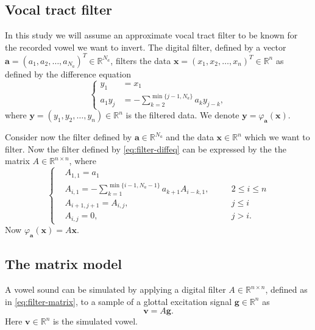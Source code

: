 \documentclass[12pt,a4]{article}
\newcommand{\R}{{\mathbb R}}
\newcommand{\vc}[1]{\ensuremath{\bm{#1}}}
\begin{document}
\subsection{Vocal tract filter}
\label{sec:filter}

In this study we will assume an approximate vocal tract filter to be known for the recorded vowel we want to invert. The digital filter, defined by a vector $\vc{a} = \left( a_1, a_2, \ldots , a_{N_a} \right)^T \in \R^{N_a}$, filters the data $\vc{x} = \left( x_1, x_2, \ldots , x_n \right)^T \in \R^n$ as defined by the difference equation
\begin{equation}
\left\{
\begin{alignedat}{1}
\label{eq:filter-diffeq}
y_1     &= x_1 \\
a_1 y_j &= -\sum_{k=2}^{\min\{j-1, N_a\}} a_{k} y_{j-k} ,
\end{alignedat}
\right.
\end{equation}
where $\vc{y} = \left( y_1, y_2, \ldots , y_n \right) \in \R^n$ is the filtered data. We denote $\vc{y} = \varphi_{\vc{a}} (\vc{x})$.

Consider now the filter defined by $\vc{a} \in \R^{N_a}$ and the data $\vc{x} \in \R^n$ which we want to filter. Now the filter defined by \eqref{eq:filter-diffeq} can be expressed by the the matrix $A \in \R^{n \times n}$, where
\begin{equation}
\label{eq:filter-matrix}
\left\{
\begin{alignedat}{3}
   &A_{1,1}     = a_1 \\
   &A_{i,1}     = - \sum_{k=1}^{\min\{ i-1, N_a-1 \}} a_{k+1} A_{i-k,1}, \quad && 2 \leq i \leq n \\
   &A_{i+1,j+1} = A_{i,j},     && j \leq i \\
   &A_{i,j}     = 0,           && j > i .
\end{alignedat}
\right.
\end{equation}
Now $\varphi_{\vc{a}} (\vc{x}) = A \vc{x}$.


\subsection{The matrix model}
\label{sec:matrixModel}

A vowel sound can be simulated by applying a digital filter $A \in \R^{n \times n}$, defined as in \eqref{eq:filter-matrix}, to a sample of a glottal excitation signal $\vc{g} \in \R^n$ as
\begin{equation}
\label{eq:vow}
\vc{v} = A \vc{g} .
\end{equation}
Here $\vc{v} \in \R^n$ is the simulated vowel.
\end{document}

